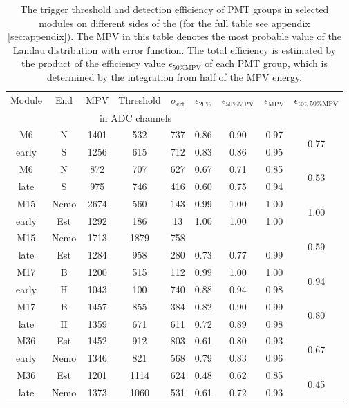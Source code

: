 \begin{table}[htb!]
  \caption{The trigger threshold and detection efficiency of PMT groups in selected modules on different sides of the \mvs{} (for the full table see appendix \ref{sec:appendix}). The MPV in this table denotes the most probable value of the Landau distribution with error function. The total efficiency is estimated by the product of the efficiency value $\epsilon_{50\%\mathrm{MPV}}$ of each PMT group, which is determined by the integration from half of the MPV energy. }
  \label{tab:efficiency_short}
  \begin{tabular}{c c c c c c c c c}
    \toprule
    Module & End & MPV & Threshold & $\sigma{}_{\mathrm{erf}}$ & $\epsilon_{20\%}$ & $\epsilon_{50\%\mathrm{MPV}}$ & $\epsilon_{\mathrm{MPV}}$ & $\epsilon_{\mathrm{tot}, 50\%\mathrm{MPV}}$ \\
           &     & \multicolumn{3}{|c|}{in ADC channels} &   \\
    \midrule
    M6     & N & 1401 & 532 & 737 & 0.86 & 0.90 & 0.97 & \multirow{2}{*}{0.77}\\
    early  & S & 1256 & 615 & 712 & 0.83 & 0.86 & 0.95 &\\
    M6     & N & 872 & 707 & 627 & 0.67 & 0.71 & 0.85 & \multirow{2}{*}{0.53}\\
    late   & S & 975 & 746 & 416 & 0.60 & 0.75 & 0.94\\
    \midrule
    M15    & Nemo & 2674 & 560 & 143 & 0.99 & 1.00 & 1.00 & \multirow{2}{*}{1.00}\\
    early  & Est & 1292 & 186 & 13 & 1.00 & 1.00 & 1.00\\
    M15    & Nemo & 1713 & 1879 & 758 &  &  &  & \multirow{2}{*}{0.59}\\
    late   & Est & 1284 & 958 & 280 & 0.73 & 0.77 & 0.99 & \\
    \midrule
    M17    & B & 1200 & 515 & 112 & 0.99 & 1.00 & 1.00 & \multirow{2}{*}{0.94}\\
    early  & H & 1043 & 100 & 740 & 0.88 & 0.94 & 0.98 &\\
    M17    & B & 1457 & 855 & 384 & 0.82 & 0.90 & 0.99 & \multirow{2}{*}{0.80} \\
    late   & H & 1359 & 671 & 611 & 0.72 & 0.89 & 0.98 & \\
    \midrule
    M36    & Est & 1452 & 912 & 803 & 0.61 & 0.80 & 0.93 & \multirow{2}{*}{0.67} \\
    early  & Nemo & 1346 & 821 & 568 & 0.79 & 0.83 & 0.96 &\\
    M36    & Est & 1201 & 1114 & 624 & 0.48 & 0.62 & 0.85 & \multirow{2}{*}{0.45}\\
    late   & Nemo & 1373 & 1060 & 531 & 0.61 & 0.72 & 0.93 & \\
    \bottomrule
  \end{tabular}
\end{table}


